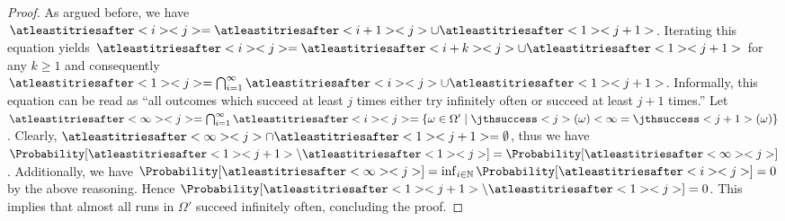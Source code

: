 \documentclass{theoretics}
\newcommand{\unionSym}{\cup}
\newcommand{\unionBin}{\mathbin{\unionSym}}
\newcommand{\intersectionSym}{\cap}
\newcommand{\intersectionBin}{\mathbin{\intersectionSym}}
\newcommand{\IntersectionSym}{\bigcap}
\newcommand{\union}{\unionBin}
\newcommand{\intersection}{\intersectionBin}
\newcommand{\Intersection}{\IntersectionSym}
\newcommand{\Naturals}{\mathbb{N}}
\begin{document}
\begin{proof}
	As argued before, we have $\atleastitriesafter<i><j> = \atleastitriesafter<i+1><j> \union \atleastitriesafter<1><j+1>$.
	Iterating this equation yields $\atleastitriesafter<i><j> = \atleastitriesafter<i+k><j> \union \atleastitriesafter<1><j+1>$ for any $k \geq 1$ and consequently $\atleastitriesafter<1><j> = \Intersection_{i=1}^\infty \atleastitriesafter<i><j> \union \atleastitriesafter<1><j+1>$.
	Informally, this equation can be read as \enquote{all outcomes which succeed at least $j$ times either try infinitely often or succeed at least $j+1$ times.}
	Let $\atleastitriesafter<\infty><j> = \Intersection_{i=1}^\infty \atleastitriesafter<i><j> = \{\omega \in \Omega' \mid \jthsuccess<j>(\omega) < \infty = \jthsuccess<j+1>(\omega)\}$.
	Clearly, $\atleastitriesafter<\infty><j> \intersection \atleastitriesafter<1><j+1> = \emptyset$, thus we have $\Probability[\atleastitriesafter<1><j+1> \setminus \atleastitriesafter<1><j>] = \Probability[\atleastitriesafter<\infty><j>]$.
	Additionally, we have $\Probability[\atleastitriesafter<\infty><j>] = \inf_{i \in \Naturals} \Probability[\atleastitriesafter<i><j>] = 0$ by the above reasoning.
	Hence $\Probability[\atleastitriesafter<1><j+1> \setminus \atleastitriesafter<1><j>] = 0$.
	This implies that almost all runs in $\Omega'$ succeed infinitely often, concluding the proof. 
\end{proof}
\end{document}
